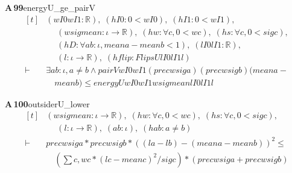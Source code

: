 \documentclass[conference]{IEEEtran}
\theoremstyle{definition}
\newcommand{\lean}[1]{\textsf{\footnotesize #1}}
\begin{document}
\noindent\textbf{A\,99}\quad\lean{energyU\_ge\_pairV}
{\footnotesize\[ \begin{aligned}[t]
&(\mathit{wI0} \mathit{wI1} : \mathbb{R} ),\; (\mathit{hI0} : 0 < \mathit{wI0}),\; (\mathit{hI1} : 0 < \mathit{wI1}),\\
&\quad \; (\mathit{w} \mathit{sig} \mathit{mean} : \iota \to \mathbb{R} ),\; (\mathit{hw} : \forall \mathit{c}, 0 < \mathit{w} \mathit{c}),\; (\mathit{hs} : \forall \mathit{c}, 0 < \mathit{sig} \mathit{c}),\\
&\quad \; (\mathit{hD} : \forall \mathit{a} \mathit{b} : \iota , \mathit{mean} \mathit{a} - \mathit{mean} \mathit{b} < 1),\; (\mathit{lI0} \mathit{lI1} : \mathbb{R} ),\\
&\quad \; (\mathit{l} : \iota \to \mathbb{R} ),\; (\mathit{hflip} : \mathit{FlipsU} \mathit{lI0} \mathit{lI1} \mathit{l})\\
\vdash\;&\exists \mathit{a} \mathit{b} : \iota , \mathit{a} \neq \mathit{b} \wedge \mathit{pairV} \mathit{wI0} \mathit{wI1} (\mathit{prec} \mathit{w} \mathit{sig} \mathit{a}) (\mathit{prec} \mathit{w} \mathit{sig} \mathit{b}) (\mathit{mean} \mathit{a} -\\
&\quad \mathit{mean} \mathit{b}) \leq \mathit{energyU} \mathit{wI0} \mathit{wI1} \mathit{w} \mathit{sig} \mathit{mean} \mathit{lI0} \mathit{lI1} \mathit{l}
\end{aligned} \]}

\noindent\textbf{A\,100}\quad\lean{outsiderU\_lower}
{\footnotesize\[ \begin{aligned}[t]
&(\mathit{w} \mathit{sig} \mathit{mean} : \iota \to \mathbb{R} ),\; (\mathit{hw} : \forall \mathit{c}, 0 < \mathit{w} \mathit{c}),\; (\mathit{hs} : \forall \mathit{c}, 0 < \mathit{sig} \mathit{c}),\\
&\quad \; (\mathit{l} : \iota \to \mathbb{R} ),\; (\mathit{a} \mathit{b} : \iota ),\; (\mathit{hab} : \mathit{a} \neq \mathit{b})\\
\vdash\;&\mathit{prec} \mathit{w} \mathit{sig} \mathit{a}*\mathit{prec} \mathit{w} \mathit{sig} \mathit{b}*((\mathit{l} \mathit{a} - \mathit{l} \mathit{b}) - (\mathit{mean} \mathit{a} - \mathit{mean} \mathit{b}))^{2} \leq\\
&\quad (\textstyle\sum \mathit{c}, \mathit{w} \mathit{c}*(\mathit{l} \mathit{c} - \mathit{mean} \mathit{c})^{2}/\mathit{sig} \mathit{c})*(\mathit{prec} \mathit{w} \mathit{sig} \mathit{a} + \mathit{prec} \mathit{w} \mathit{sig} \mathit{b})
\end{aligned} \]}
\end{document}
